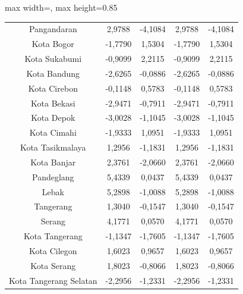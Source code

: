 \begin{table}[H]
\begin{adjustbox}{max width=\textwidth, max height=0.85\textheight}
\begin{tabular}{|c|c|c|c|c|}
Pangandaran & 2,9788 & -4,1084 & 2,9788 & -4,1084 \\
Kota Bogor & -1,7790 & 1,5304 & -1,7790 & 1,5304 \\
Kota Sukabumi & -0,9099 & 2,2115 & -0,9099 & 2,2115 \\
Kota Bandung & -2,6265 & -0,0886 & -2,6265 & -0,0886 \\
Kota Cirebon & -0,1148 & 0,5783 & -0,1148 & 0,5783 \\
Kota Bekasi & -2,9471 & -0,7911 & -2,9471 & -0,7911 \\
Kota Depok & -3,0028 & -1,1045 & -3,0028 & -1,1045 \\
Kota Cimahi & -1,9333 & 1,0951 & -1,9333 & 1,0951 \\
Kota Tasikmalaya & 1,2956 & -1,1831 & 1,2956 & -1,1831 \\
Kota Banjar & 2,3761 & -2,0660 & 2,3761 & -2,0660 \\
Pandeglang & 5,4339 & 0,0437 & 5,4339 & 0,0437 \\
Lebak & 5,2898 & -1,0088 & 5,2898 & -1,0088 \\
Tangerang & 1,3040 & -0,1547 & 1,3040 & -0,1547 \\
Serang & 4,1771 & 0,0570 & 4,1771 & 0,0570 \\
Kota Tangerang & -1,1347 & -1,7605 & -1,1347 & -1,7605 \\
Kota Cilegon & 1,6023 & 0,9657 & 1,6023 & 0,9657 \\
Kota Serang & 1,8023 & -0,8066 & 1,8023 & -0,8066 \\
Kota Tangerang Selatan & -2,2956 & -1,2331 & -2,2956 & -1,2331 \\
\hline
\end{tabular}
\end{adjustbox}
\end{table}